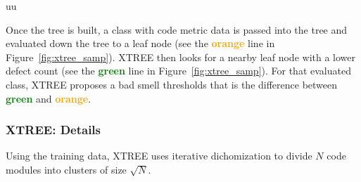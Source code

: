 uu \documentclass[final,twocolumn,5p]{elsarticle}
\newcommand{\fig}[1]{Figure~\ref{fig:#1}}
\theoremstyle{break}
\begin{document}
     Once the tree is built, a class with code metric data is passed into the tree and evaluated down the tree to a leaf node (see the \textcolor{orange}{{\bf orange}} line in \fig{xtree_samp}).
      XTREE then looks for a nearby leaf node with a lower defect
      count (see the \textcolor{green}{{\bf green}} line in \fig{xtree_samp}). For that evaluated class, XTREE proposes a bad smell
      thresholds that is  the difference between 
      \textcolor{green}{{\bf green}} and \textcolor{orange}{{\bf orange}}. 
  
  
\subsubsection{XTREE:   Details}

Using the training data,  XTREE uses  
iterative dichomization to
  divide  $N$ code modules  into  clusters of
size $\sqrt{N}$.
\end{document}
